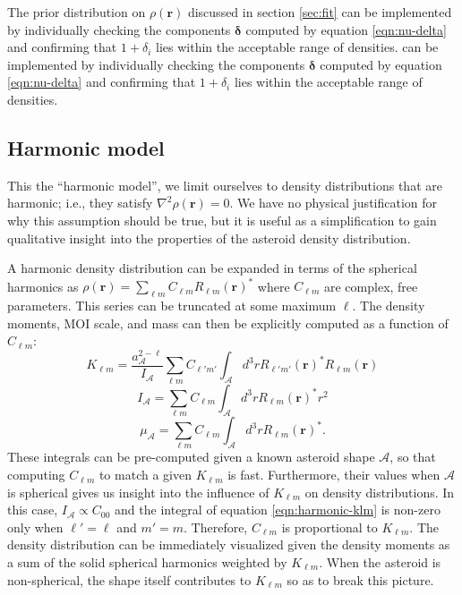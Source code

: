 The prior distribution on $\rho(\bm r)$ discussed in section \ref{sec:fit} can be implemented by individually checking the components $\bm \delta$ computed by equation \ref{eqn:nu-delta} and confirming that $1 + \delta_i$ lies within the acceptable range of densities.
 can be implemented by individually checking the components $\bm \delta$ computed by equation \ref{eqn:nu-delta} and confirming that $1 + \delta_i$ lies within the acceptable range of densities.


\subsection{Harmonic model}
This the ``harmonic model'', we limit ourselves to density distributions that are harmonic; i.e., they satisfy $\nabla^2 \rho(\bm r) = 0$. We have no physical justification for why this assumption should be true, but it is useful as a simplification to gain qualitative insight into the properties of the asteroid density distribution.

A harmonic density distribution can be expanded in terms of the spherical harmonics as $\rho(\bm r) = \sum_{\ell m} C_{\ell m} R_{\ell m}(\bm r)^*$ where $C_{\ell m}$ are complex, free parameters. This series can be truncated at some maximum $\ell$. The density moments, MOI scale, and mass can then be explicitly computed as a function of $C_{\ell m}$:
\begin{equation}
  K_{\ell m} = \frac{a_\mathcal{A}^{2-\ell}}{I_\mathcal{A}} \sum_{\ell m} C_{\ell' m'} \int_\mathcal{A} d^3 r R_{\ell' m'}(\bm r)^* R_{\ell m}(\bm r)
  \label{eqn:harmonic-klm}
\end{equation}
\begin{equation}
  I_\mathcal{A} = \sum_{\ell m} C_{\ell m} \int_\mathcal{A} d^3 r R_{\ell m}(\bm r)^* r^2
  \label{eqn:harmonic-ia}
\end{equation}
\begin{equation}
  \mu_\mathcal{A} = \sum_{\ell m} C_{\ell m} \int_\mathcal{A} d^3 r R_{\ell m}(\bm r)^*.
  \label{eqn:harmonic-mass}
\end{equation}
These integrals can be pre-computed given a known asteroid shape $\mathcal{A}$, so that computing $C_{\ell m}$ to match a given $K_{\ell m}$ is fast. Furthermore, their values when $\mathcal{A}$ is spherical gives us insight into the influence of $K_{\ell m}$ on density distributions. In this case, $I_\mathcal{A} \propto C_{00}$ and the integral of equation \ref{eqn:harmonic-klm} is non-zero only when $\ell' = \ell$ and $m'=m$. Therefore, $C_{\ell m}$ is proportional to $K_{\ell m}$. The density distribution can be immediately visualized given the density moments as a sum of the solid spherical harmonics weighted by $K_{\ell m}$. When the asteroid is non-spherical, the shape itself contributes to $K_{\ell m}$ so as to break this picture.

